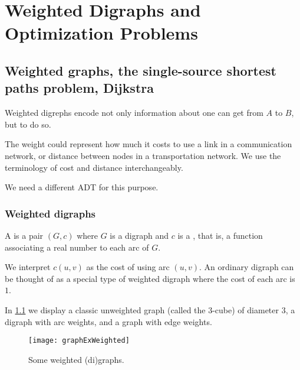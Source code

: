 \part{Weighted Digraphs and Optimization Problems}
\label{ch:weighted}


\chapter{Weighted graphs, the single-source shortest paths problem, Dijkstra}



Weighted digrephs encode not only information about   one can get from $A$ to $B$, but
 to do so.

The weight could represent how much it costs to use a link
in a communication network, or distance between nodes in a
transportation network. We use the terminology of cost and distance
interchangeably.

We need a different ADT for this purpose. 

\section{Weighted digraphs}
\label{sec:weighted}

\begin{Definition}
A  is a pair $(G, c)$ where $G$ is a digraph
and $c$ is a , that is, a function associating a
real number to each arc of $G$.
\end{Definition}

We interpret $c(u, v)$ as the cost of using arc $(u, v)$. An ordinary digraph 
can be thought of as a special type of weighted digraph where the cost of each 
arc is $1$. 


In \cref{fig:graphExample5} we display a classic unweighted graph
(called the $3$-cube) of diameter $3$, a digraph with arc weights, and a
graph with edge weights.

\begin{figure}
  \centering
  \texttt{[image: graphExWeighted]}
  \caption{Some weighted (di)graphs.}
  \label{fig:graphExample5}
\end{figure}

